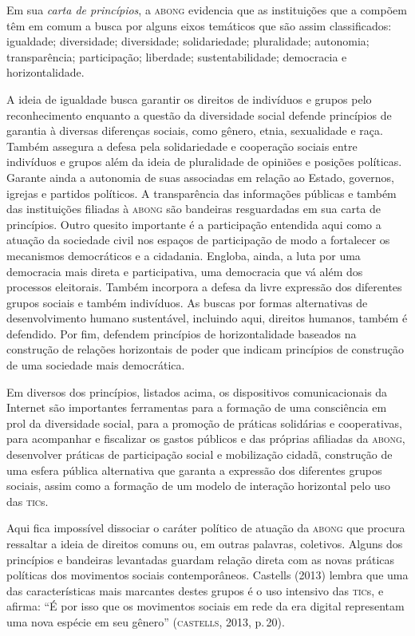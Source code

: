 Em sua \textit{carta de princípios}, a \textsc{abong} evidencia que as
instituições que a compõem têm em comum a busca por alguns eixos
temáticos que são assim classificados: igualdade; diversidade; diversidade; solidariedade; pluralidade; autonomia; transparência; participação; liberdade; sustentabilidade; democracia e horizontalidade.

A ideia de igualdade busca garantir os direitos de indivíduos e grupos
pelo reconhecimento enquanto a questão da diversidade social defende
princípios de garantia à diversas diferenças sociais, como gênero,
etnia, sexualidade e raça. Também assegura a defesa pela solidariedade
e cooperação sociais entre indivíduos e grupos além da ideia de
pluralidade de opiniões e posições políticas. Garante ainda a autonomia
de suas associadas em relação ao Estado, governos, igrejas e partidos
políticos. A transparência das informações públicas e também das
instituições filiadas à \textsc{abong} são bandeiras resguardadas em sua carta de
princípios. Outro quesito importante é a participação entendida aqui
como a atuação da sociedade civil nos espaços de participação de modo a
fortalecer os mecanismos democráticos e a cidadania. Engloba, ainda, a
luta por uma democracia mais direta e participativa, uma democracia que
vá além dos processos eleitorais. Também incorpora a defesa da livre
expressão dos diferentes grupos sociais e também indivíduos. As buscas
por formas alternativas de desenvolvimento humano sustentável, incluindo
aqui, direitos humanos, também é defendido. Por fim, defendem princípios
de horizontalidade baseados na construção de relações horizontais de
poder que indicam princípios de construção de uma sociedade mais
democrática.

Em diversos dos princípios, listados acima, os dispositivos
comunicacionais da Internet são importantes ferramentas para a formação
de uma consciência em prol da diversidade social, para a promoção de
práticas solidárias e cooperativas, para acompanhar e fiscalizar os
gastos públicos e das próprias afiliadas da \textsc{abong}, desenvolver práticas
de participação social e mobilização cidadã, construção de uma esfera
pública alternativa que garanta a expressão dos diferentes grupos
sociais, assim como a formação de um modelo de interação horizontal pelo
uso das \textsc{tic}s.

Aqui fica impossível dissociar o caráter político de atuação da \textsc{abong}
que procura ressaltar a ideia de direitos comuns ou, em outras palavras,
coletivos. Alguns dos princípios e bandeiras levantadas guardam relação
direta com as novas práticas políticas dos movimentos sociais
contemporâneos. Castells (2013) lembra que uma das características mais
marcantes destes grupos é o uso intensivo das \textsc{tic}s, e afirma: ``É por
isso que os movimentos sociais em rede da era digital representam uma
nova espécie em seu gênero'' (\textsc{castells}, 2013, p.\,20).

